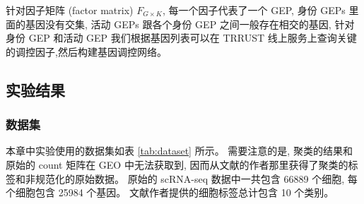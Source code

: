 针对因子矩阵 (factor matrix) $F_{G \times K}$, 每一个因子代表了一个 GEP, 
身份 GEPs 里面的基因没有交集, 活动 GEPs 跟各个身份 GEP 之间一般存在相交的基因, 
针对身份 GEP 和活动 GEP 我们根据基因列表可以在 TRRUST 线上服务上查询关键的调控因子,然后构建基因调控网络。

\subsection{实验结果}
\subsubsection{数据集}
本章中实验使用的数据集如表 \ref{tab:dataset} 所示。
需要注意的是, 聚类的结果和原始的 count 矩阵在 GEO 中无法获取到,
因而从文献的作者那里获得了聚类的标签和非规范化的原始数据。
原始的 scRNA-seq 数据中一共包含 66889 个细胞, 每个细胞包含 25984 个基因。
文献作者提供的细胞标签总计包含 10 个类别。

\begin{table}[!htbp]
    \caption{\label{tab:dataset}使用的公开数据集} 
\end{table}

